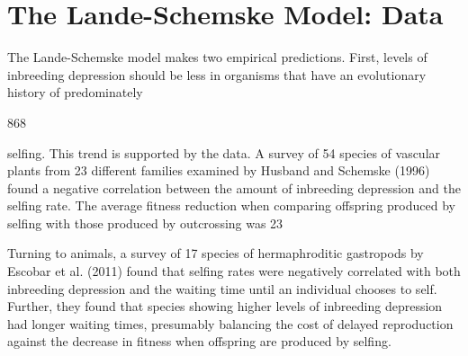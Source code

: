 \documentclass{article}
\begin{document}
\section{The Lande-Schemske Model: Data}
The Lande-Schemske model makes two empirical predictions. First, levels of inbreeding depression should be less in organisms that have an evolutionary history of predominately

868

selfing. This trend is supported by the data. A survey of 54 species of vascular plants from 23 different families examined by Husband and Schemske (1996) found a negative correlation between the amount of inbreeding depression and the selfing rate. The average fitness reduction when comparing offspring produced by selfing with those produced by outcrossing was 23%

Turning to animals, a survey of 17 species of hermaphroditic gastropods by Escobar et al. (2011) found that selfing rates were negatively correlated with both inbreeding depression and the waiting time until an individual chooses to self. Further, they found that species showing higher levels of inbreeding depression had longer waiting times, presumably balancing the cost of delayed reproduction against the decrease in fitness when offspring are produced by selfing.
\end{document}
